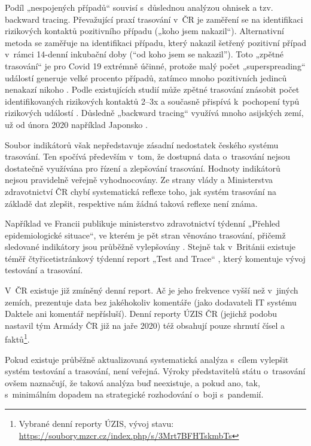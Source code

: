 Podíl „nespojených případů“ souvisí s~důslednou analýzou ohnisek a tzv. backward tracing. Převažující praxí trasování v~ČR je zaměření se na identifikaci rizikových kontaktů pozitivního případu („koho jsem nakazil“). Alternativní metoda se zaměřuje na identifikaci případu, který nakazil šetřený pozitivní případ v~rámci 14-denní inkubační doby (“od koho jsem se nakazil”). Toto „zpětné trasování“ je pro Covid 19 extrémně účinné, protože malý počet „superspreading“ událostí generuje velké procento případů, zatímco mnoho pozitivních jedinců nenakazí nikoho \cite{tr_adam_clustering_2020}. Podle existujících studií může zpětné trasování znásobit počet identifikovaných rizikových kontaktů 2--3x a současně přispívá k~pochopení typů rizikových událostí \cite{tr_Endo}. Důsledně „backward tracing“ využívá mnoho asijských zemí, už od února 2020 například Japonsko \cite{tr_Loh}.

Soubor indikátorů však nepředstavuje zásadní nedostatek českého systému trasování. Ten spočívá především v~tom, že dostupná data o~trasování nejsou dostatečně využívána pro řízení a zlepšování trasování. Hodnoty indikátorů nejsou pravidelně veřejně vyhodnocovány. Ze strany vlády a Ministerstva zdravotnictví ČR chybí systematická reflexe toho, jak systém trasování na základě dat zlepšit, respektive nám žádná taková reflexe není známa.

Například ve Francii publikuje ministerstvo zdravotnictví týdenní „Přehled epidemiologické situace“, ve kterém je pět stran věnováno trasování, přičemž sledované indikátory jsou průběžně vylepšovány \cite{tr_france}. Stejně tak v~Británii existuje téměř čtyřicetistránkový týdenní report „Test and Trace“ \cite{tr_gov_uk}, který komentuje vývoj testování a trasování.

V~ČR existuje již zmíněný denní report. Ač je jeho frekvence vyšší než v~jiných zemích, prezentuje data bez jakéhokoliv komentáře (jako dodavateli IT systému Daktele ani komentář nepřísluší). Denní reporty ÚZIS ČR (jejichž podobu nastavil tým Armády ČR již na jaře 2020) též obsahují pouze shrnutí čísel a faktů\footnote{Vybrané denní reporty ÚZIS, vývoj stavu: \url{https://soubory.mzcr.cz/index.php/s/3Mrt7BFHTskmbTs}}.

Pokud existuje průběžně aktualizovaná systematická analýza s~cílem vylepšit systém testování a trasování, není veřejná. Výroky představitelů státu o~trasování ovšem naznačují, že taková analýza buď neexistuje, a pokud ano, tak, s~minimálním dopadem na strategické rozhodování o~boji s~pandemií.

